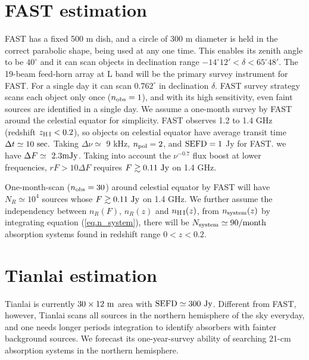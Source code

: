 \documentclass[]{raa}
\newcommand{\HI}{{H{\small\,I}}}
\begin{document}
\section{FAST estimation}\label{sec.FAST}

FAST has a fixed 500 m dish, and a circle of 300 m diameter is held
in the correct parabolic shape, being used at any one time. This
enables its zenith angle to be $40^\circ$ and it can scan objects
in declination range $-14^\circ 12'<\delta<65^\circ 48'$.
The 19-beam feed-horn array at L band will be the primary survey
instrument for FAST. For a single day it can scan $0.762^\circ$
in declination $\delta$. FAST survey strategy scans each object
only once ($n_{\rm obs}=1$), and with its high sensitivity,
even faint sources are identified in a single day. 
We assume a one-month survey by FAST
around the celestial equator for simplicity. FAST observes
1.2 to 1.4 GHz (redshift $z_{\rm \HI}<0.2$), so objects on celestial equator
have average transit time $\Delta t \simeq 10\ {\rm sec.}$
Taking $\Delta\nu\simeq$ 9 kHz, $n_{\rm pol}=2$, and
${\rm SEFD}=1$ Jy for FAST.
we have $\Delta F \simeq\ 2.3 {\rm mJy}$.
Taking into account the $\nu^{-0.7}$ flux boost at lower
frequencies, $rF>10\Delta F$ requires $F\gtrsim 0.11\ {\rm Jy}$ on 1.4 GHz.

One-month-scan ($n_{\rm obs}=30$) around celestial equator by FAST will have
$N_R\simeq 10^4$ sources whose $F\gtrsim 0.11\ {\rm Jy}$ on 1.4 GHz.
We further assume the independency between $n_R(F)$, $n_R(z)$
and $n_{\rm\HI}(z)$, from $n_{\rm system}(z)$ by integrating
equation (\ref{eq.n_system}), there will be $N_{\rm system}\simeq 90 {\rm /month}$ absorption
systems found in redshift range $0<z<0.2$.


\section{Tianlai estimation}\label{sec.Tianlai}

Tianlai is currently $30\times 12\ {\rm m}$ area with
${\rm SEFD}\simeq 300\ {\rm Jy}$. Different from FAST, however,
Tianlai scans all sources in the northern hemisphere of the sky
everyday, and one needs longer periods integration to
identify absorbers with fainter background sources.
We forecast its one-year-survey ability of searching 21-cm
absorption systems in the northern hemisphere.
\end{document}
